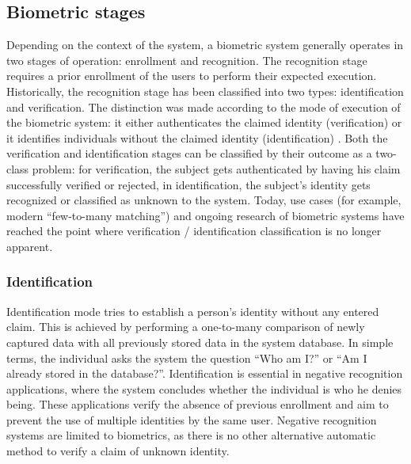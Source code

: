 \subsection{Biometric stages}
Depending on the context of the system, a biometric system generally operates in two stages of operation: enrollment and recognition. The recognition stage requires a prior enrollment of the users to perform their expected execution. Historically, the recognition stage has been classified into two types: identification and verification.  The distinction was made according to the mode of execution of the biometric system: it either authenticates the claimed identity (verification) or it identifies individuals without the claimed identity (identification) \cite{BiometricSystemsBook}. Both the verification and identification stages can be classified by their outcome as a two-class problem: for verification, the subject gets authenticated by having his claim successfully verified or rejected\cite{BiometricSystemBasic}, in identification, the subject's identity gets recognized or classified as unknown to the system. 
Today, use cases (for example, modern ``few-to-many matching'') and ongoing research of biometric systems have reached the point where verification / identification classification is no longer apparent\cite{BiometricSystemsBook}.

\subsubsection{Identification}
Identification mode tries to establish a person's identity without any entered claim. This is achieved by performing a one-to-many comparison of newly captured data with all previously stored data in the system database. In simple terms, the individual asks the system the question ``Who am I?'' or ``Am I already stored in the database?''\cite{BiometricAuthentication}. Identification is essential in negative recognition applications, where the system concludes whether the individual is who he denies being. These applications verify the absence of previous enrollment and aim to prevent the use of multiple identities by the same user. Negative recognition systems are limited to biometrics, as there is no other alternative automatic method to verify a claim of unknown identity\cite{HandbookOfBiometrics}.

